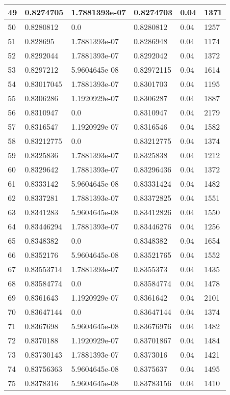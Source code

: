 \begin{longtable}{|l|l|l|l|l|l|}
49 & 0.8274705 & 1.7881393e-07 & 0.8274703 & 0.04 & 1371 \\ \hline 
50 & 0.8280812 & 0.0 & 0.8280812 & 0.04 & 1257 \\ \hline 
51 & 0.828695 & 1.7881393e-07 & 0.8286948 & 0.04 & 1174 \\ \hline 
52 & 0.8292044 & 1.7881393e-07 & 0.8292042 & 0.04 & 1372 \\ \hline 
53 & 0.8297212 & 5.9604645e-08 & 0.82972115 & 0.04 & 1614 \\ \hline 
54 & 0.83017045 & 1.7881393e-07 & 0.8301703 & 0.04 & 1195 \\ \hline 
55 & 0.8306286 & 1.1920929e-07 & 0.8306287 & 0.04 & 1887 \\ \hline 
56 & 0.8310947 & 0.0 & 0.8310947 & 0.04 & 2179 \\ \hline 
57 & 0.8316547 & 1.1920929e-07 & 0.8316546 & 0.04 & 1582 \\ \hline 
58 & 0.83212775 & 0.0 & 0.83212775 & 0.04 & 1374 \\ \hline 
59 & 0.8325836 & 1.7881393e-07 & 0.8325838 & 0.04 & 1212 \\ \hline 
60 & 0.8329642 & 1.7881393e-07 & 0.83296436 & 0.04 & 1372 \\ \hline 
61 & 0.8333142 & 5.9604645e-08 & 0.83331424 & 0.04 & 1482 \\ \hline 
62 & 0.8337281 & 1.7881393e-07 & 0.83372825 & 0.04 & 1551 \\ \hline 
63 & 0.8341283 & 5.9604645e-08 & 0.83412826 & 0.04 & 1550 \\ \hline 
64 & 0.83446294 & 1.7881393e-07 & 0.83446276 & 0.04 & 1256 \\ \hline 
65 & 0.8348382 & 0.0 & 0.8348382 & 0.04 & 1654 \\ \hline 
66 & 0.8352176 & 5.9604645e-08 & 0.83521765 & 0.04 & 1552 \\ \hline 
67 & 0.83553714 & 1.7881393e-07 & 0.8355373 & 0.04 & 1435 \\ \hline 
68 & 0.83584774 & 0.0 & 0.83584774 & 0.04 & 1478 \\ \hline 
69 & 0.8361643 & 1.1920929e-07 & 0.8361642 & 0.04 & 2101 \\ \hline 
70 & 0.83647144 & 0.0 & 0.83647144 & 0.04 & 1374 \\ \hline 
71 & 0.8367698 & 5.9604645e-08 & 0.83676976 & 0.04 & 1482 \\ \hline 
72 & 0.8370188 & 1.1920929e-07 & 0.83701867 & 0.04 & 1484 \\ \hline 
73 & 0.83730143 & 1.7881393e-07 & 0.8373016 & 0.04 & 1421 \\ \hline 
74 & 0.83756363 & 5.9604645e-08 & 0.8375637 & 0.04 & 1495 \\ \hline 
75 & 0.8378316 & 5.9604645e-08 & 0.83783156 & 0.04 & 1410 \\ \hline 
\end{longtable}